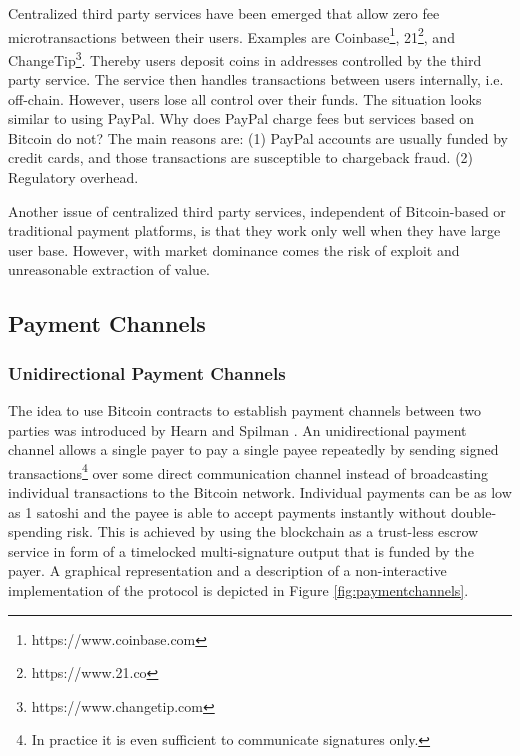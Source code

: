 Centralized third party services have been emerged that allow zero fee microtransactions between their users. Examples are Coinbase\footnote{https://www.coinbase.com}, 21\footnote{https://www.21.co}, and ChangeTip\footnote{https://www.changetip.com}. Thereby users deposit coins in addresses controlled by the third party service. The service then handles transactions between users internally, i.e. off-chain. However, users lose all control over their funds. The situation looks similar to using PayPal. Why does PayPal charge fees but services based on Bitcoin do not? The main reasons are: (1) PayPal accounts are usually funded by credit cards, and those transactions are susceptible to chargeback fraud. (2) Regulatory overhead. 

Another issue of centralized third party services, independent of Bitcoin-based or traditional payment platforms, is that they work only well when they have large user base. However, with market dominance comes the risk of exploit and unreasonable extraction of value. 

\subsection{Payment Channels}

\subsubsection{Unidirectional Payment Channels}
\label{sec:unipc}

The idea to use Bitcoin contracts to establish payment channels between two parties was introduced by Hearn and Spilman \parencite{Hearn2013,Spilman2013}. An unidirectional payment channel allows a single payer to pay a single payee repeatedly by sending signed transactions\footnote{In practice it is even sufficient to communicate signatures only.} over some direct communication channel instead of broadcasting individual transactions to the Bitcoin network. Individual payments can be as low as 1 satoshi and the payee is able to accept payments instantly without double-spending risk. This is achieved by using the blockchain as a trust-less escrow service in form of a timelocked multi-signature output that is funded by the payer. A graphical representation and a description of a non-interactive implementation of the protocol is depicted in Figure \ref{fig:paymentchannels}.


